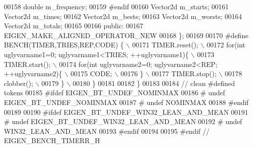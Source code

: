 \begin{DoxyCode}
00158   \textcolor{keywordtype}{double} m\_frequency;
00159 \textcolor{preprocessor}{#endif}
00160   Vector2d m\_starts;
00161   Vector2d m\_times;
00162   Vector2d m\_bests;
00163   Vector2d m\_worsts;
00164   Vector2d m\_totals;
00165 
00166 \textcolor{keyword}{public}:
00167   EIGEN\_MAKE\_ALIGNED\_OPERATOR\_NEW
00168 \};
00169 
00170 \textcolor{preprocessor}{#define BENCH(TIMER,TRIES,REP,CODE) \{ \(\backslash\)}
00171 \textcolor{preprocessor}{    TIMER.reset(); \(\backslash\)}
00172 \textcolor{preprocessor}{    for(int uglyvarname1=0; uglyvarname1<TRIES; ++uglyvarname1)\{ \(\backslash\)}
00173 \textcolor{preprocessor}{      TIMER.start(); \(\backslash\)}
00174 \textcolor{preprocessor}{      for(int uglyvarname2=0; uglyvarname2<REP; ++uglyvarname2)\{ \(\backslash\)}
00175 \textcolor{preprocessor}{        CODE; \(\backslash\)}
00176 \textcolor{preprocessor}{      \} \(\backslash\)}
00177 \textcolor{preprocessor}{      TIMER.stop(); \(\backslash\)}
00178 \textcolor{preprocessor}{      clobber(); \(\backslash\)}
00179 \textcolor{preprocessor}{    \} \(\backslash\)}
00180 \textcolor{preprocessor}{  \}}
00181 
00182 \}
00183 
00184 \textcolor{comment}{// clean #defined tokens}
00185 \textcolor{preprocessor}{#ifdef EIGEN\_BT\_UNDEF\_NOMINMAX}
00186 \textcolor{preprocessor}{# undef EIGEN\_BT\_UNDEF\_NOMINMAX}
00187 \textcolor{preprocessor}{# undef NOMINMAX}
00188 \textcolor{preprocessor}{#endif}
00189 
00190 \textcolor{preprocessor}{#ifdef EIGEN\_BT\_UNDEF\_WIN32\_LEAN\_AND\_MEAN}
00191 \textcolor{preprocessor}{# undef EIGEN\_BT\_UNDEF\_WIN32\_LEAN\_AND\_MEAN}
00192 \textcolor{preprocessor}{# undef WIN32\_LEAN\_AND\_MEAN}
00193 \textcolor{preprocessor}{#endif}
00194 
00195 \textcolor{preprocessor}{#endif // EIGEN\_BENCH\_TIMERR\_H}
\end{DoxyCode}
